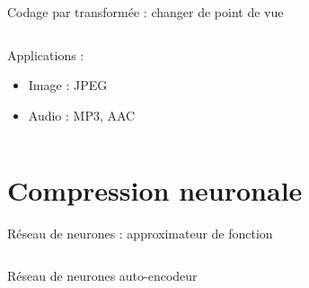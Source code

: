 \documentclass[9pt, aspectratio=169]{beamer}
\begin{document}
\begin{frame}{Codage par transformée : changer de point de vue} %
\begin{columns}
   \begin{column}{0.6\textwidth}
		Applications :
        \begin{itemize}
            \item Image : JPEG
            \item Audio : MP3, AAC
        \end{itemize}

   \end{column}
   \begin{column}{0.39\textwidth}
		
   \end{column}
\end{columns}
\end{frame}

\section{Compression neuronale}

\begin{frame}{} %
\begin{center}
\Huge \insertsection
\end{center}
\end{frame}

\begin{frame}{Réseau de neurones : approximateur de fonction} %
\begin{columns}
   \begin{column}{0.48\textwidth}
   \end{column}
   \begin{column}{0.48\textwidth}
   \end{column}
\end{columns}
\end{frame}

\begin{frame}{Réseau de neurones auto-encodeur} %
\begin{columns}
   \begin{column}{0.48\textwidth}
   \end{column}
   \begin{column}{0.48\textwidth}
   \end{column}
\end{columns}
\end{frame}
\end{document}
